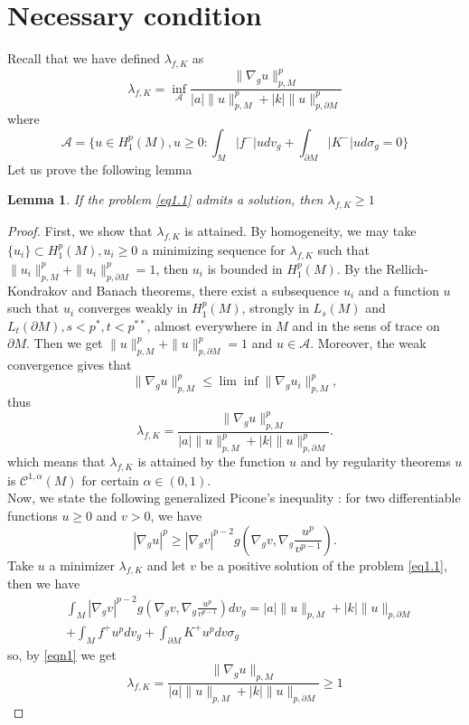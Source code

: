\documentclass{Tran-l}
\newtheorem{lem}[thm]{Lemma}
\theoremstyle{definition}
\theoremstyle{remark}
\numberwithin{equation}{section}
\begin{document}
\section{Necessary condition}
Recall that we have defined  $\lambda_{f,K}$ as
\begin{equation*}
    \lambda_{f,K}=\inf_{\mathcal{A}}\frac{\|\nabla_gu\|_{p,M}^p} {|a|\|u\|_{p,M}^p+|k|\|u\|_{p,\partial M}^p}
\end{equation*}
where
\begin{equation*}
    {\mathcal{A}}=\{u\in H_1^p(M),u\geq0: \int_M|f^-|udv_g+\int_{\partial M}|K^-|ud\sigma_g=0\}
\end{equation*}
Let us prove the following  lemma
\begin{lem}\label{lem3.1}
If the problem \ref{eq1.1} admits a solution, then
$\lambda_{f,K}\geq1$
\end{lem}
\begin{proof} First, we show that $\lambda_{f,K}$ is attained. By homogeneity, we may
take $\{u_i\}\subset H^p_1(M),u_i\geq0$ a minimizing sequence for
$\lambda_{f,K}$ such that $\|u_i\|_{p,M}^p+\|u_i\|_{p,\partial
M}^p=1$, then $u_i$ is bounded in $H^p_1(M)$. By the
Rellich-Kondrakov and Banach theorems, there exist a subsequence
$u_i$ and a function $u$ such that $u_i$ converges weakly in
$H^p_1(M)$, strongly in $L_s(M)$ and $L_t(\partial M),s<p^*,
t<p^{**}$, almost everywhere in $M$ and in the sens of trace on
$\partial M$. Then we get $\|u\|_{p,M}^p+\|u\|_{p,\partial M}^p=1$
and $u\in {\mathcal{A}}$. Moreover, the weak convergence gives that
\begin{equation*}
    \|\nabla_gu\|_{p,M}^p\leq\lim\inf\|\nabla_gu_i\|_{p,M}^p,
\end{equation*}
thus
\begin{equation*}
\lambda_{f,K}=\frac{\|\nabla_gu\|_{p,M}^p}
{|a|\|u\|_{p,M}^p+|k|\|u\|_{p,\partial M}^p}.
\end{equation*}
which means that $\lambda_{f,K}$ is attained by the function $u$ and
by regularity theorems $u$ is ${\mathcal{C}}^{1,\alpha}(M)$ for certain
$\alpha\in(0,1)$.\\
Now, we state the following generalized Picone's inequality
\cite{Abdellaoui-Peral}: for two differentiable functions $u\ge0$
and $v>0$, we have
\begin{equation}\label{eqn1}
|\nabla_gu|^p\ge|\nabla_gv|^{p-2}g
\left(\nabla_gv,\nabla_g\frac{u^p}{v^{p-1}}\right).
\end{equation}
Take $u$ a minimizer $\lambda_{f,K}$ and let $v$ be a positive
solution of the problem \eqref{eq1.1}, then we have
\begin{eqnarray*}
&\int_M|\nabla_gv|^{p-2}g
\left(\nabla_gv,\nabla_g\frac{u^p}{v^{p-1}}\right)dv_g=|a|\|u\|_{p,M}+|k|\|u\|_{p,\partial
M}\\&+\int_Mf^+u^pdv_g+\int_{\partial M}K^+u^pdv\sigma_g
\end{eqnarray*}
so, by \eqref{eqn1} we get
\begin{equation*}
\lambda_{f,K}=\frac{\|\nabla_gu\|_{p,M}}{|a|\|u\|_{p,M}+|k|\|u\|_{p,\partial
M}}\geq1
\end{equation*}
\end{proof}
\end{document}
